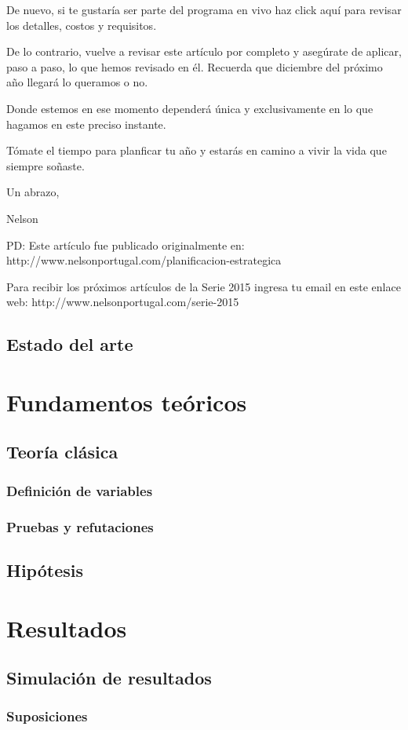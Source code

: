 \documentclass[12pt]{book}
\begin{document}
De nuevo, si te gustaría ser parte del programa en vivo haz click aquí para revisar los detalles, costos y requisitos.

De lo contrario, vuelve a revisar este artículo por completo y asegúrate de aplicar, paso a paso, lo que hemos revisado en él. Recuerda que diciembre del próximo año llegará lo queramos o no.

Donde estemos en ese momento dependerá única y exclusivamente en lo que hagamos en este preciso instante.

Tómate el tiempo para planficar tu año y estarás en camino a vivir la vida que siempre soñaste.

Un abrazo,

Nelson

PD: Este artículo fue publicado originalmente en: http://www.nelsonportugal.com/planificacion-estrategica

Para recibir los próximos artículos de la Serie 2015 ingresa tu email en este enlace web: http://www.nelsonportugal.com/serie-2015
\section{Estado del arte}
\chapter{Fundamentos teóricos}
\section{Teoría clásica}
\subsection{Definición de variables}
\subsection{Pruebas y refutaciones}
\section{Hipótesis}
\chapter{Resultados}
\section{Simulación de resultados}
\subsection{Suposiciones}
\end{document}
